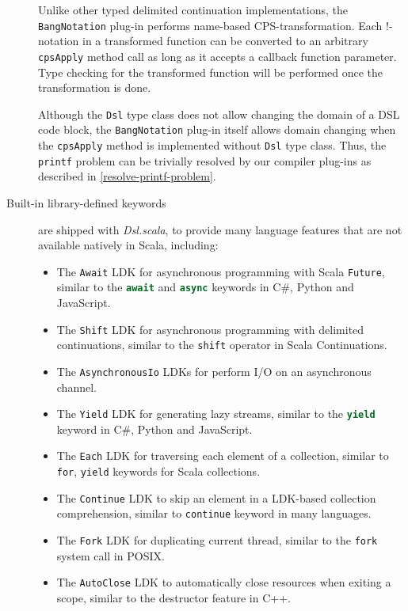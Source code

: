 \begin{description}
  Unlike other typed delimited continuation implementations, the \lstinline{BangNotation} plug-in performs name-based CPS-transformation. Each !-notation in a transformed function can be converted to an arbitrary \lstinline{cpsApply} method call as long as it accepts a callback function parameter. Type checking for the transformed function will be performed once the transformation is done.

  Although the \lstinline{Dsl} type class does not allow changing the domain of a DSL code block, the \lstinline{BangNotation} plug-in itself allows domain changing when the \lstinline{cpsApply} method is implemented without \lstinline{Dsl} type class. Thus, the \lstinline{printf} problem can be trivially resolved by our compiler plug-ins as described in \cref{resolve-printf-problem}.

  \item[Built-in library-defined keywords] are shipped with \textit{Dsl.scala}, to provide many language features that are not available natively in Scala, including:
  \begin{itemize}
    \item The \lstinline{Await} LDK for asynchronous programming with Scala \lstinline{Future}, similar to the \lstinline[language=Python,style=Python3]{await} and \lstinline[language=Python,style=Python3]{async} keywords in C\#, Python and JavaScript.
    \item The \lstinline{Shift} LDK for asynchronous programming with delimited continuations, similar to the \lstinline{shift} operator in Scala Continuations.
    \item The \lstinline{AsynchronousIo} LDKs for perform I/O on an asynchronous channel.
    \item The \lstinline{Yield} LDK for generating lazy streams, similar to the \lstinline[language=Python,style=Python3]{yield} keyword in C\#, Python and JavaScript.
    \item The \lstinline{Each} LDK for traversing each element of a collection, similar to \lstinline{for}, \lstinline{yield} keywords for Scala collections.
    \item The \lstinline{Continue} LDK to skip an element in a LDK-based collection comprehension, similar to \lstinline{continue} keyword in many languages.
    \item The \lstinline{Fork} LDK for duplicating current thread, similar to the \lstinline{fork} system call in POSIX.
    \item The \lstinline{AutoClose} LDK to automatically close resources when exiting a scope, similar to the destructor feature in C++.

\end{itemize}
\end{description}
